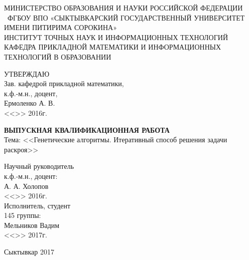 \documentclass[14pt]{extarticle}
\begin{document}
\thispagestyle{empty}
	\begin{center}
		\small
		МИНИСТЕРСТВО ОБРАЗОВАНИЯ И НАУКИ РОССИЙСКОЙ ФЕДЕРАЦИИ\\~ФГБОУ ВПО «СЫКТЫВКАРСКИЙ ГОСУДАРСТВЕННЫЙ УНИВЕРСИТЕТ ИМЕНИ ПИТИРИМА СОРОКИНА»\\
		ИНСТИТУТ ТОЧНЫХ НАУК И ИНФОРМАЦИОННЫХ ТЕХНОЛОГИЙ\\
		КАФЕДРА ПРИКЛАДНОЙ МАТЕМАТИКИ И ИНФОРМАЦИОННЫХ ТЕХНОЛОГИЙ В ОБРАЗОВАНИИ\\
	\end{center}
	\vspace{0.5cm}
	\begin{flushright}
		УТВЕРЖДАЮ\\
		Зав. кафедрой прикладной математики,\\
		к.ф.-м.н., доцент,\\
		\underline{\phantom{aaaaaaaaaaaa}}Ермоленко А. В.\\
		<<\underline{\phantom{aaaa}}>>\underline{\phantom{aaaaaaaaaaaa}} 2016г.\\
	\end{flushright}
	\begin{center}		
		\vspace{2.5cm}
		\large \textbf{ВЫПУСКНАЯ КВАЛИФИКАЦИОННАЯ РАБОТА}\\
		Тема: <<Генетические алгоритмы. Итеративный способ решения задачи раскроя>>
	\end{center}
	\begin{flushright}
		\small Научный руководитель\\к.ф.-м.н., доцент:\\\underline{\phantom{aaaaaaaaaaa}}А. А. Холопов\\
		<<\underline{\phantom{aaaa}}>>\underline{\phantom{aaaaaaaaaaa}} 2016г.\\
		\vspace{0.5cm}
		Исполнитель, студент\\145 группы:\\\underline{\phantom{aaaaaaaaaaa}}Мельников Вадим\\<<\underline{\phantom{aaaa}}>>\underline{\phantom{aaaaaaaaaaa}} 2017г.\\
	\end{flushright}
	\vspace{3cm}
	\begin{center}
		Сыктывкар 2017
	\end{center}
	\newpage
	\tableofcontents
	\thispagestyle{empty}
	\newpage
\end{document}
